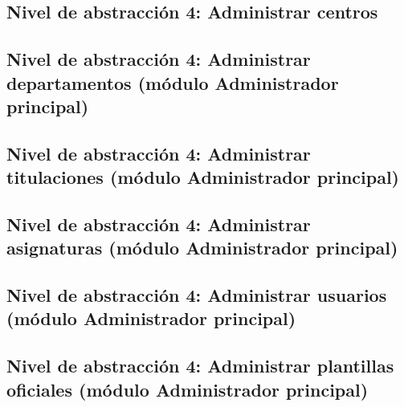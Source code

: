 \subsection{Nivel de abstracción 4: Administrar centros}



\subsection{Nivel de abstracción 4: Administrar departamentos (módulo Administrador principal)}



\subsection{Nivel de abstracción 4: Administrar titulaciones (\-mó\-dulo Administrador principal)}



\subsection{Nivel de abstracción 4: Administrar asignaturas (\-mó\-dulo Administrador principal)}



\subsection{Nivel de abstracción 4: Administrar usuarios (\-mó\-dulo Administrador principal)}



\subsection{Nivel de abstracción 4: Administrar plantillas oficiales (\-mó\-dulo Administrador principal)}

